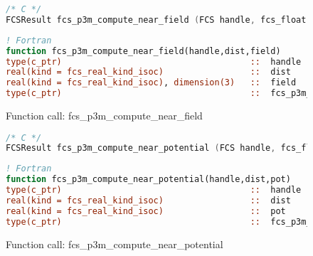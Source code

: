 \begin{figure}[htb]
\begin{lstlisting}[language=C,frame=trBL,breaklines,basicstyle=\ttfamily,prebreak={\raisebox{0ex}[0ex][0ex]{\ensuremath{\hookleftarrow}}}]
/* C */
FCSResult fcs_p3m_compute_near_field (FCS handle, fcs_float dist, fcs_float *field);
\end{lstlisting}
\begin{lstlisting}[language=Fortran,frame=trBL,breaklines,basicstyle=\ttfamily,prebreak={\raisebox{0ex}[0ex][0ex]{\ensuremath{\hookleftarrow}}}]
! Fortran
function fcs_p3m_compute_near_field(handle,dist,field)
type(c_ptr)                                     ::  handle
real(kind = fcs_real_kind_isoc)                 ::  dist
real(kind = fcs_real_kind_isoc), dimension(3)   ::  field
type(c_ptr)                                     ::  fcs_p3m_compute_near_field
\end{lstlisting}
\caption{Function call: fcs\_p3m\_compute\_near\_field}
\label{fig:fcs_p3m_compute_near_field}
\end{figure}

\begin{figure}[htb]
\begin{lstlisting}[language=C,frame=trBL,breaklines,basicstyle=\ttfamily,prebreak={\raisebox{0ex}[0ex][0ex]{\ensuremath{\hookleftarrow}}}]
/* C */
FCSResult fcs_p3m_compute_near_potential (FCS handle, fcs_float dist, fcs_float *pot);
\end{lstlisting}
\begin{lstlisting}[language=Fortran,frame=trBL,breaklines,basicstyle=\ttfamily,prebreak={\raisebox{0ex}[0ex][0ex]{\ensuremath{\hookleftarrow}}}]
! Fortran
function fcs_p3m_compute_near_potential(handle,dist,pot)
type(c_ptr)                                     ::  handle
real(kind = fcs_real_kind_isoc)                 ::  dist
real(kind = fcs_real_kind_isoc)                 ::  pot
type(c_ptr)                                     ::  fcs_p3m_compute_near_potential
\end{lstlisting}
\caption{Function call: fcs\_p3m\_compute\_near\_potential}
\label{fig:fcs_p3m_compute_near_potential}
\end{figure}

